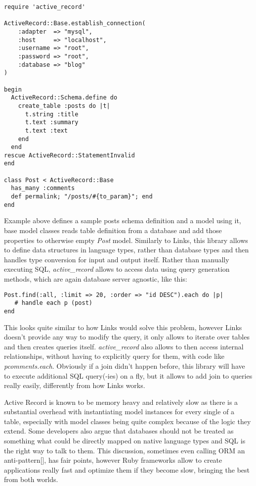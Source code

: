 \begin{codelisting}
\begin{verbatim}
require 'active_record'

ActiveRecord::Base.establish_connection(
    :adapter  => "mysql",
    :host     => "localhost",
    :username => "root",
    :password => "root",
    :database => "blog"
)

begin
  ActiveRecord::Schema.define do
    create_table :posts do |t|
      t.string :title
      t.text :summary
      t.text :text
    end
  end
rescue ActiveRecord::StatementInvalid
end

class Post < ActiveRecord::Base
  has_many :comments
  def permalink; "/posts/#{to_param}"; end
end
\end{verbatim}
\end{codelisting}

Example above defines a sample posts schema definition and a model using it, base model classes reads table definition from a database and add those properties to otherwise empty \textit{Post} model. Similarly to Links, this library allows to define data structures in language types, rather than database types and then handles type conversion for input and output itself. Rather than manually executing SQL, \textit{active\_record} allows to access data using query generation methods, which are again database server agnostic, like this:

\begin{codelisting}
\begin{verbatim}
Post.find(:all, :limit => 20, :order => "id DESC").each do |p|
   # handle each p (post)
end
\end{verbatim}
\end{codelisting}

This looks quite similar to how Links would solve this problem, however Links doesn't provide any way to modify the query, it only allows to iterate over tables and then creates queries itself. \textit{active\_record} also allows to then access internal relationships, without having to explicitly query for them, with code like \textit{    pcomments.each}. Obviously if a join didn't happen before, this library will have to execute additional SQL query(-ies) on a fly, but it allows to add join to queries really easily, differently from how Links works.

Active Record is known to be memory heavy and relatively slow as there is a substantial overhead with instantiating model instances for every single of a table, especially with model classes being quite complex because of the logic they extend. Some developers also argue that databases should not be treated as something what could be directly mapped on native language types and SQL is the right way to talk to them. This discussion, sometimes even calling ORM an anti-pattern[], has fair points, however Ruby frameworks allow to create applications really fast and optimize them if they become slow, bringing the best from both worlds.

